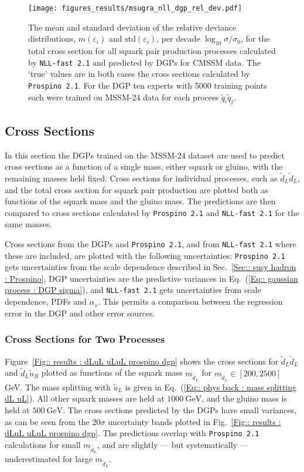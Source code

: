 \documentclass[twoside,english]{uiofysmaster}
\begin{document}
{{\begin{figure}
\centering
\texttt{[image: figures\_results/msugra\_nll\_dgp\_rel\_dev.pdf]}
\caption{The mean and standard deviation of the relative deviance distributions, $m(\varepsilon_i)$ and $\mathrm{std}(\varepsilon_i)$, per decade $\log_{10} \sigma / \sigma_0$, for the total cross section for all squark pair production processes calculated by {\tt NLL-fast 2.1} and predicted by DGPs for CMSSM data. The `true' values are in both cases the cross sections calculated by {\tt Prospino 2.1}. For the DGP ten experts with 5000 training points each were trained on MSSM-24 data for each process $\widetilde{q}_i \widetilde{q}_j$.}
\label{Fig:: results : RD CMSSM}
\end{figure}

\subsection{Cross Sections}\label{Sec:: results : Cross Sections}

In this section the DGPs trained on the MSSM-24 dataset are used to predict cross sections as a function of a single mass, either squark or gluino, with the remaining masses held fixed. Cross sections for individual processes, such as $\widetilde{d}_L \widetilde{d}_L$, and the total cross section for squark pair production are plotted both as functions of the squark mass and the gluino mass. The predictions are then compared to cross sections calculated by \verb|Prospino 2.1| and \verb|NLL-fast 2.1| for the same masses.

Cross sections from the DGPs and \verb|Prospino 2.1|, and from \verb|NLL-fast 2.1| where these are included, are plotted with the following uncertainties: \verb|Prospino 2.1| gets uncertainties from the scale dependence described in Sec.~\ref{Sec:: susy hadron : Prospino}, DGP uncertainties are the predictive variances in Eq.~(\ref{Eq:: gaussian process : DGP sigma}), and \verb|NLL-fast 2.1| gets uncertainties from scale dependence, PDFs and $\alpha_s$. This permits a comparison between the regression error in the DGP and other error sources.

\subsubsection{Cross Sections for Two Processes}
Figure~\ref{Fig:: results : dLuL uLuL prospino dgp} shows the cross sections for $\widetilde{d}_L \widetilde{d}_L$ and $\widetilde{d}_L \widetilde{u}_R$ plotted as functions of the squark mass $m_{\widetilde{d}_L}$ for $m_{\widetilde{d}_L}\in[200, 2500]$ GeV. The mass splitting with $\widetilde{u}_L$ is given in Eq.~(\ref{Eq:: phys back : mass splitting dL uL}). All other squark masses are held at $1000~\mathrm{GeV}$, and the gluino mass is held at $500~\mathrm{GeV}$. The cross sections predicted by the DGPs have small variances, as can be seen from the $20 \sigma$ uncertainty bands plotted in Fig.~\ref{Fig:: results : dLuL uLuL prospino dgp}. The predictions overlap with \verb|Prospino 2.1| calculations for small $m_{\widetilde{d}_L}$, and are slightly --- but systematically --- underestimated for large $m_{\widetilde{d}_L}$. 

}}
\end{document}
